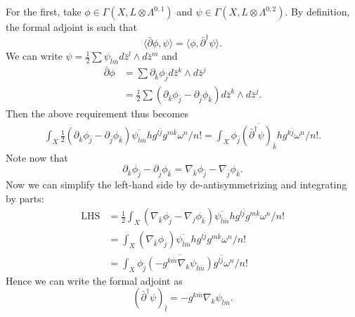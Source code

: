 \documentclass{../mathnotes}
\begin{document}
\begin{enumerate}[(a)]
        For the first, take $\phi\in\Gamma(X,L\otimes \Lambda^{0,1})$ and $\psi\in\Gamma(X,L\otimes\Lambda^{0,2})$. By definition,
        the formal adjoint is such that
        \[\langle \bar\partial \phi,\psi\rangle=\langle\phi,\bar\partial^\dagger\psi\rangle.\]
        We can write $\psi=\frac{1}{2}\sum\psi_{\bar l\bar m}d\bar z^l\wedge d\bar z^m$ and
        \begin{align*}
            \bar\partial\phi&=\sum\partial_{\bar k}\phi_{\bar j}d\bar z^k\wedge d\bar z^j\\
            &=\frac{1}{2}\sum\left( \partial_{\bar k}\phi_{\bar j}-\partial_{\bar j}\phi_{\bar k}\right)d\bar z^k\wedge d\bar z^j.
        \end{align*}
        Then the above requirement thus becomes
        \begin{align*}
            \int_X \frac{1}{2}\left( \partial_{\bar k}\phi_{\bar j}-\partial_{\bar j}\phi_{\bar k}  \right)\overline{\psi_{\bar l\bar m}}hg^{l\bar j}g^{m\bar k}\omega^n/n!=\int_X \phi_{\bar j}\overline{(\bar\partial^\dagger\psi)_{\bar k}}hg^{k\bar j}\omega^n/n!.
        \end{align*}
        Note now that
        \[\partial_{\bar k}\phi_{\bar j}-\partial_{\bar j}\phi_{\bar k}=\nabla_{\bar k}\phi_{\bar j}-\nabla_{\bar j}\phi_{\bar k}.\]
        Now we can simplify the left-hand side by de-antisymmetrizing and integrating by parts:
        \begin{align*}
            \text{LHS}&=\frac{1}{2}\int_X(\nabla_{\bar k}\phi_{\bar j}-\nabla_j\phi_{\bar k})\overline{\psi_{\bar l\bar m}}hg^{l\bar j}g^{m\bar k}\omega^n/n!\\
            &=\int_X(\nabla_{\bar k}\phi_{\bar j}) \overline{\psi_{\bar l\bar m}}hg^{l\bar j}g^{m\bar k}\omega^n/n!\\
            &=\int_X \phi_{\bar j}\overline{(-g^{k\bar m}\nabla_k\psi_{\bar l\bar m})}g^{l\bar j}\omega^n/n!
        \end{align*}
        Hence we can write the formal adjoint as
        \[(\bar\partial^\dagger\psi)_{\bar l}=-g^{k\bar m}\nabla_k\psi_{\bar l\bar m}.\]


\end{enumerate}
\end{document}
